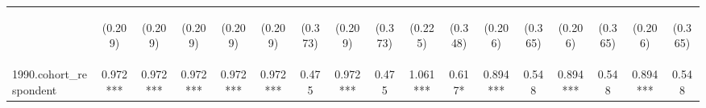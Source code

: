 \begin{center}
\begin{tabular}{lcccccccccccccccc}
\vspace{4pt} & \begin{footnotesize}(0.209)\end{footnotesize} & \begin{footnotesize}(0.209)\end{footnotesize} & \begin{footnotesize}(0.209)\end{footnotesize} & \begin{footnotesize}(0.209)\end{footnotesize} & \begin{footnotesize}(0.209)\end{footnotesize} & \begin{footnotesize}(0.373)\end{footnotesize} & \begin{footnotesize}(0.209)\end{footnotesize} & \begin{footnotesize}(0.373)\end{footnotesize} & \begin{footnotesize}(0.225)\end{footnotesize} & \begin{footnotesize}(0.348)\end{footnotesize} & \begin{footnotesize}(0.206)\end{footnotesize} & \begin{footnotesize}(0.365)\end{footnotesize} & \begin{footnotesize}(0.206)\end{footnotesize} & \begin{footnotesize}(0.365)\end{footnotesize} & \begin{footnotesize}(0.206)\end{footnotesize} & \begin{footnotesize}(0.365)\end{footnotesize} \\
1990.cohort\_respondent & 0.972*** & 0.972*** & 0.972*** & 0.972*** & 0.972*** & 0.475 & 0.972*** & 0.475 & 1.061*** & 0.617* & 0.894*** & 0.548 & 0.894*** & 0.548 & 0.894*** & 0.548 \\

\end{tabular}
\end{center}
